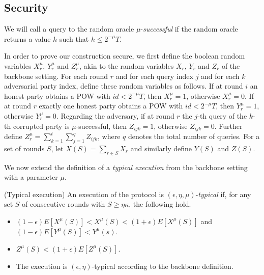\subsection{Security}

We will call a query to the random oracle $\mu$-\textit{successful} if the
random oracle returns a value $h$ such that $h \leq 2^{-\mu}T$.

In order to prove our construction secure, we first define the boolean random
variables $X_r^\mu$, $Y_r^\mu$ and $Z_r^\mu$, akin to the random variables
$X_r$, $Y_r$ and $Z_r$ of the backbone setting\cite{backbone}. For each round $r$ and for each
query index $j$ and for each $k$ adversarial party index, define these random
variables as follows.  If at round $i$ an honest party obtains a POW with $id <
2^{-\mu}T$, then $X_r^\mu = 1$, otherwise $X_r^\mu = 0$. If at round $r$
exactly one honest party obtains a POW with $id < 2^{-\mu}T$, then $Y_r^\mu =
1$, otherwise $Y_r^\mu = 0$. Regarding the adversary, if at round $r$ the
$j$-th query of the $k$-th corrupted party is $\mu$-successful, then $Z_{ijk} =
1$, otherwise $Z_{ijk} = 0$. Further define $Z^\mu_r = \sum_{k=1}^t
\sum_{j=1}^q Z_{ijk}$, where $q$ denotes the total number of queries. For a set
of rounds $S$, let $X(S) = \sum_{r \in S} X_r$ and similarly define $Y(S)$ and
$Z(S)$.

We now extend the definition of a \textit{typical execution} from the backbone
setting\cite{backbone} with a parameter $\mu$.

\begin{definition}{(Typical execution)}
    An execution of the protocol is $(\epsilon, \eta, \mu)$-\textit{typical} if, for any set $S$ of consecutive rounds with $S \geq \eta\kappa$, the following hold.

    \begin{itemize}
        \item $(1 - \epsilon)E[X^\mu(S)] < X^\mu(S) < (1 + \epsilon)E[X^\mu(S)]$ and $(1 - \epsilon)E[Y^\mu(S)] < Y^\mu(s)$.
        \item $Z^\mu(S) < (1 + \epsilon)E[Z^\mu(S)]$.
        \item The execution is $(\epsilon, \eta)$-typical according to the backbone definition.
    \end{itemize}
\end{definition}

